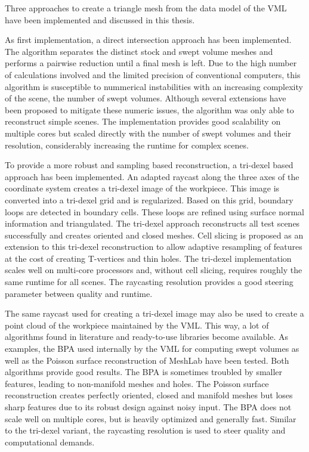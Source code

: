 Three approaches to create a triangle mesh from the data model of the VML have been implemented and discussed in this thesis.


As first implementation, a direct intersection approach has been implemented.
The algorithm separates the distinct stock and swept volume meshes and performs a pairwise reduction until a final mesh is left.
Due to the high number of calculations involved and the limited precision of conventional computers, this algorithm is susceptible to nummerical instabilities with an increasing complexity of the scene, \eg the number of swept volumes.
Although several extensions have been proposed to mitigate these numeric issues, the algorithm was only able to reconstruct simple scenes.
The implementation provides good scalability on multiple cores but scaled directly with the number of swept volumes and their resolution, considerably increasing the runtime for complex scenes.

To provide a more robust and sampling based reconstruction, a tri-dexel based approach has been implemented.
An adapted raycast along the three axes of the coordinate system creates a tri-dexel image of the workpiece.
This image is converted into a tri-dexel grid and is regularized.
Based on this grid, boundary loops are detected in boundary cells.
These loops are refined using surface normal information and triangulated.
The tri-dexel approach reconstructs all test scenes successfully and creates oriented and closed meshes.
Cell slicing is proposed as an extension to this tri-dexel reconstruction to allow adaptive resampling of features at the cost of creating T-vertices and thin holes.
The tri-dexel implementation scales well on multi-core processors and, without cell slicing, requires roughly the same runtime for all scenes.
The raycasting resolution provides a good steering parameter between quality and runtime.

The same raycast used for creating a tri-dexel image may also be used to create a point cloud of the workpiece maintained by the VML.
This way, a lot of algorithms found in literature and ready-to-use libraries become available.
As examples, the BPA used internally by the VML for computing swept volumes as well as the Poisson surface reconstruction of MeshLab have been tested.
Both algorithms provide good results.
The BPA is sometimes troubled by smaller features, leading to non-manifold meshes and holes.
The Poisson surface reconstruction creates perfectly oriented, closed and manifold meshes but loses sharp features due to its robust design against noisy input.
The BPA does not scale well on multiple cores, but is heavily optimized and generally fast.
Similar to the tri-dexel variant, the raycasting resolution is used to steer quality and computational demands.


